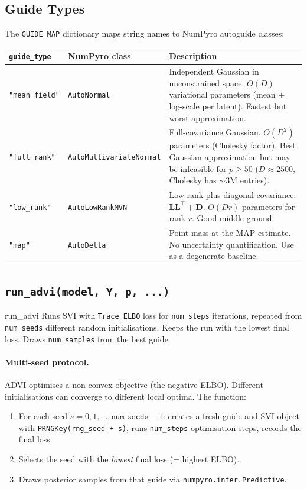 \documentclass[11pt,a4paper]{article}
\begin{document}
\subsection{Guide Types}

The \texttt{GUIDE\_MAP} dictionary maps string names to NumPyro autoguide classes:

\begin{center}
\begin{tabular}{@{}llp{6.5cm}@{}}
\toprule
\texttt{guide\_type} & NumPyro class & Description \\
\midrule
\texttt{"mean\_field"} & \texttt{AutoNormal} & Independent Gaussian in unconstrained space. $O(D)$ variational parameters (mean + log-scale per latent). Fastest but worst approximation. \\
\texttt{"full\_rank"} & \texttt{AutoMultivariateNormal} & Full-covariance Gaussian. $O(D^2)$ parameters (Cholesky factor). Best Gaussian approximation but may be infeasible for $p \ge 50$ ($D \approx 2500$, Cholesky has $\sim 3$M entries). \\
\texttt{"low\_rank"} & \texttt{AutoLowRankMVN} & Low-rank-plus-diagonal covariance: $\bm{L}\bm{L}^\top + \bm{D}$. $O(Dr)$ parameters for rank $r$. Good middle ground. \\
\texttt{"map"} & \texttt{AutoDelta} & Point mass at the MAP estimate. No uncertainty quantification. Use as a degenerate baseline. \\
\bottomrule
\end{tabular}
\end{center}

\subsection{\texttt{run\_advi(model, Y, p, ...)}}

\begin{funccard}{run\_advi}
Runs SVI with \texttt{Trace\_ELBO} loss for \texttt{num\_steps} iterations, repeated from \texttt{num\_seeds} different random initialisations. Keeps the run with the lowest final loss. Draws \texttt{num\_samples} from the best guide.
\end{funccard}

\paragraph{Multi-seed protocol.}
ADVI optimises a non-convex objective (the negative ELBO). Different initialisations can converge to different local optima. The function:
\begin{enumerate}[nosep]
  \item For each seed $s = 0, 1, \ldots, \texttt{num\_seeds}{-}1$: creates a fresh guide and SVI object with \texttt{PRNGKey(rng\_seed + s)}, runs \texttt{num\_steps} optimisation steps, records the final loss.
  \item Selects the seed with the \emph{lowest} final loss (= highest ELBO).
  \item Draws posterior samples from that guide via \texttt{numpyro.infer.Predictive}.
\end{enumerate}
\end{document}
